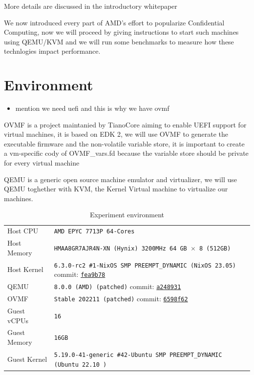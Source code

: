 \documentclass[twocolumn]{article}
\begin{document}
    More details are discussed in the introductory whitepaper \cite{sev-snp}

    We now introduced every part of AMD's effort to popularize Confidential Computing, now we will proceed by giving instructions to start such machines using QEMU/KVM and we will run some benchmarks to measure how these technlogies impact performance.


\section{Environment}
\label{sec:environment}

    \begin{itemize}
        \item mention we need uefi and this is why we have ovmf
    \end{itemize}
    OVMF is a project maintanied by TianoCore aiming to enable UEFI support for virtual machines, it is based on EDK 2, we will use OVMF to generate the executable firmware and the non-volatile variable store, it is important to create a vm-specific cody of OVMF\_vars.fd because the variable store should be private for every virtual machine

    QEMU is a generic open source machine emulator and virtualizer, we will use QEMU toghether with KVM, the Kernel Virtual machine to virtualize our machines.
    \begin{table}
        \centering
        \label{tab:experiment-environment}
        \begin{tabular}{l|l}
            \hline
            Host CPU      & \texttt{AMD EPYC 7713P 64-Cores}                                            \\
            Host Memory   & \texttt{HMAA8GR7AJR4N-XN (Hynix) 3200MHz 64 GB $\times$ 8 (512GB)}          \\
            Host Kernel   & \texttt{6.3.0-rc2 \#1-NixOS SMP PREEMPT\_DYNAMIC (NixOS 23.05)} commit: \href{https://github.com/AMDESE/linux/tree/fea9b785bfa90e015c7d81526e36060da1bf01d1}{\texttt{fea9b78}}            \\
            QEMU          & \texttt{8.0.0 (AMD) (patched)} commit: \href{https://github.com/AMDESE/qemu/tree/a248931547843b9edb0f3b0c7d6d0c76ffdf7659}{\texttt{a248931}}                                             \\
            OVMF          & \texttt{Stable 202211 (patched)} commit: \href{https://github.com/AMDESE/ovmf/commit/6598f62bda4eb884c65d6c0aed7ede64258a41d8}{\texttt{6598f62}}                                     \\
            Guest vCPUs   & \texttt{16}                                                                 \\
            Guest Memory  & \texttt{16GB}                                                               \\
            Guest Kernel  & \texttt{5.19.0-41-generic \#42-Ubuntu SMP PREEMPT\_DYNAMIC (Ubuntu 22.10 )} \\ 
            \hline
        \end{tabular}
        \caption{Experiment environment}
    \end{table}
\end{document}
